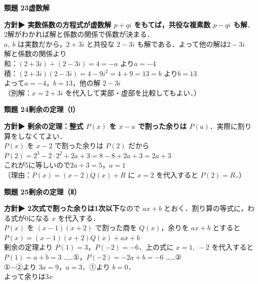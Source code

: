 \documentclass[a4paper,11pt]{ltjsarticle}
\newcommand{\ans}[2]{\Needspace{5\baselineskip}\vspace{6pt}%
  {\sffamily\bfseries 類題 #1\quad #2}\par}
\newcommand{\point}[1]{\textsf{\bfseries ▶ #1}}
\begin{document}
\ans{23}{虚数解}
\begin{kai}
\textbf{方針}\quad \point{実数係数の方程式が虚数解 $p+qi$ をもてば，共役な複素数 $p-qi$ も解}．2解がわかれば解と係数の関係で係数が決まる．\\[2pt]
$a,\ b$ は実数だから，$2+3i$ と共役な $2-3i$ も解である．よって他の解は\quad $2-3i$\\[2pt]
解と係数の関係より\\
\hspace*{1.5em}和：$(2+3i)+(2-3i)=4=-a$ より\quad $a=-4$\\
\hspace*{1.5em}積：$(2+3i)(2-3i)=4-9i^2=4+9=13=b$ より\quad $b=13$\\[2pt]
よって\quad $a=-4$，\quad $b=13$，\quad 他の解 $2-3i$\\
（別解：$x=2+3i$ を代入して実部・虚部を比較してもよい．）
\end{kai}

\ans{24}{剰余の定理（Ⅰ）}
\begin{kai}
\textbf{方針}\quad \point{剰余の定理：整式 $P(x)$ を $x-a$ で割った余りは $P(a)$}．実際に割り算をしなくてよい．\\[2pt]
$P(x)$ を $x-2$ で割った余りは $P(2)$ だから\\
\hspace*{1.5em}$P(2)=2^3-2\cdot2^2+2a+3=8-8+2a+3=2a+3$\\
これが5に等しいので\quad $2a+3=5$，\quad $a=1$\\
（理由：$P(x)=(x-2)Q(x)+R$ に $x=2$ を代入すると $P(2)=R$．）
\end{kai}

\ans{25}{剰余の定理（Ⅱ）}
\begin{kai}
\textbf{方針}\quad \point{2次式で割った余りは1次以下}なので $ax+b$ とおく．割り算の等式に，わる式が0になる $x$ を代入する．\\[2pt]
$P(x)$ を $(x-1)(x+2)$ で割った商を $Q(x)$，余りを $ax+b$ とすると\\
\hspace*{1.5em}$P(x)=(x-1)(x+2)Q(x)+ax+b$\\[2pt]
剰余の定理より $P(1)=3$，$P(-2)=-6$．上の式に $x=1,\ -2$ を代入すると\\
\hspace*{1.5em}$P(1)=a+b=3$ ……①，\quad $P(-2)=-2a+b=-6$ ……②\\
①$-$②より $3a=9$，$a=3$．①より $b=0$．\\[2pt]
よって余りは\quad $3x$
\end{kai}
\end{document}

